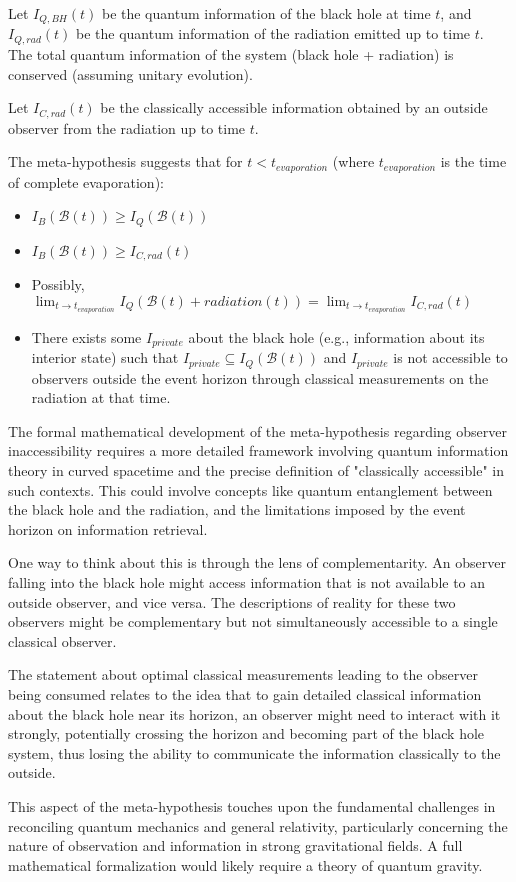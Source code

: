 \documentclass{article}
\begin{document}
\begin{enumerate}
		Let $I_{Q, BH}(t)$ be the quantum information of the black hole at time $t$, and $I_{Q, rad}(t)$ be the quantum information of the radiation emitted up to time $t$. The total quantum information of the system (black hole + radiation) is conserved (assuming unitary evolution).
		
		Let $I_{C, rad}(t)$ be the classically accessible information obtained by an outside observer from the radiation up to time $t$.
		
		The meta-hypothesis suggests that for $t < t_{evaporation}$ (where $t_{evaporation}$ is the time of complete evaporation):
		
		\begin{itemize}
			\item $I_B(\mathcal{B}(t)) \ge I_Q(\mathcal{B}(t))$
			\item $I_B(\mathcal{B}(t)) \ge I_{C, rad}(t)$
			\item Possibly, $\lim_{t \to t_{evaporation}} I_Q(\mathcal{B}(t) + radiation(t)) = \lim_{t \to t_{evaporation}} I_{C, rad}(t)$
			\item There exists some $I_{private}$ about the black hole (e.g., information about its interior state) such that $I_{private} \subseteq I_Q(\mathcal{B}(t))$ and $I_{private}$ is not accessible to observers outside the event horizon through classical measurements on the radiation at that time.
		\end{itemize}
		
		The formal mathematical development of the meta-hypothesis regarding observer inaccessibility requires a more detailed framework involving quantum information theory in curved spacetime and the precise definition of "classically accessible" in such contexts. This could involve concepts like quantum entanglement between the black hole and the radiation, and the limitations imposed by the event horizon on information retrieval.
		
		One way to think about this is through the lens of complementarity. An observer falling into the black hole might access information that is not available to an outside observer, and vice versa. The descriptions of reality for these two observers might be complementary but not simultaneously accessible to a single classical observer.
		
		The statement about optimal classical measurements leading to the observer being consumed relates to the idea that to gain detailed classical information about the black hole near its horizon, an observer might need to interact with it strongly, potentially crossing the horizon and becoming part of the black hole system, thus losing the ability to communicate the information classically to the outside.
		
		This aspect of the meta-hypothesis touches upon the fundamental challenges in reconciling quantum mechanics and general relativity, particularly concerning the nature of observation and information in strong gravitational fields. A full mathematical formalization would likely require a theory of quantum gravity.
		
	\end{enumerate}
	
\end{document}
